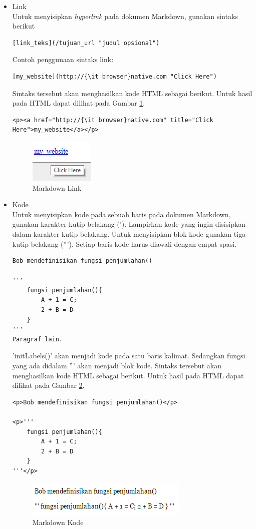 \begin{itemize}
\item Link\\
Untuk menyisipkan {\it hyperlink} pada dokumen Markdown, gunakan sintaks berikut 
\begin{lstlisting}[basicstyle=\footnotesize]
[link_teks](/tujuan_url "judul opsional")
\end{lstlisting}
Contoh penggunaan sintaks link:
\begin{lstlisting}[basicstyle=\footnotesize]
[my_website](http://{\it browser}native.com "Click Here")
\end{lstlisting}
Sintaks tersebut akan menghasilkan kode HTML sebagai berikut. Untuk
hasil pada HTML dapat dilihat pada Gambar \ref{fig:ml}.
\begin{lstlisting}[basicstyle=\footnotesize]
<p><a href="http://{\it browser}native.com" title="Click Here">my_website</a></p>
\end{lstlisting}
\begin{figure}[H]
\centering
\includegraphics[scale=1]{Gambar/ml.png}
\caption[Markdown Link]{Markdown Link}
\label{fig:ml}
\end{figure}

\item Kode\\
Untuk menyisipkan kode pada sebuah baris pada dokumen Markdown, gunakan karakter
kutip belakang ('). Lampirkan kode yang ingin disisipkan dalam karakter kutip
belakang. Untuk menyisipkan blok kode gunakan tiga kutip belakang ('''). Setiap
baris kode harus diawali dengan empat spasi.
\begin{lstlisting}[basicstyle=\footnotesize]
Bob mendefinisikan fungsi penjumlahan()

'''
    fungsi penjumlahan(){
        A + 1 = C;
        2 + B = D
    }
'''
Paragraf lain.
\end{lstlisting}
'initLabels()' akan menjadi kode pada satu baris kalimat. Sedangkan fungsi yang ada didalam ''' akan menjadi blok kode. Sintaks tersebut akan menghasilkan kode HTML sebagai berikut. Untuk hasil pada HTML dapat dilihat pada Gambar
\ref{fig:kode}.
\begin{lstlisting}[basicstyle=\footnotesize]
<p>Bob mendefinisikan fungsi penjumlahan()</p>

<p>'''
    fungsi penjumlahan(){
        A + 1 = C;
        2 + B = D
    }
'''</p>
\end{lstlisting}
\begin{figure}[H]
\centering
\includegraphics[scale=0.7]{Gambar/kode.png}
\caption[Markdown Kode]{Markdown Kode}
\label{fig:kode}
\end{figure}


\end{itemize}
